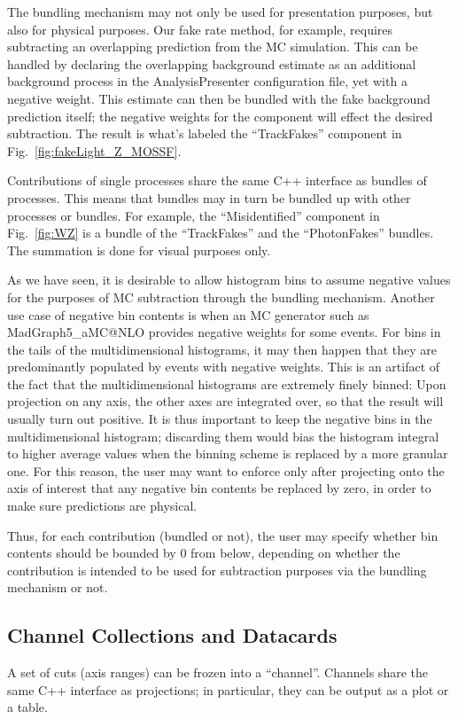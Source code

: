 The bundling mechanism may not only be used for presentation purposes, but also for physical purposes. Our fake rate method, for example, requires subtracting an overlapping prediction from the \ttbar MC simulation. This can be handled by declaring the overlapping \ttbar background estimate as an additional background process in the AnalysisPresenter configuration file, yet with a negative weight. This estimate can then be bundled with the fake background prediction itself; the negative weights for the \ttbar component will effect the desired subtraction. The result is what's labeled the ``TrackFakes'' component in Fig.~\ref{fig:fakeLight_Z_MOSSF}.

Contributions of single processes share the same C++ interface as bundles of processes. This means that bundles may in turn be bundled up with other processes or bundles. For example, the ``Misidentified'' component in Fig.~\ref{fig:WZ} is a bundle of the ``TrackFakes'' and the ``PhotonFakes'' bundles. The summation is done for visual purposes only.

As we have seen, it is desirable to allow histogram bins to assume negative values for the purposes of MC subtraction through the bundling mechanism. Another use case of negative bin contents is when an MC generator such as MadGraph5\_aMC@NLO \cite{Alwall:2011uj} provides negative weights for some events. For bins in the tails of the multidimensional histograms, it may then happen that they are predominantly populated by events with negative weights. This is an artifact of the fact that the multidimensional histograms are extremely finely binned: Upon projection on any axis, the other axes are integrated over, so that the result will usually turn out positive. It is thus important to keep the negative bins in the multidimensional histogram; discarding them would bias the histogram integral to higher average values when the binning scheme is replaced by a more granular one. For this reason, the user may want to enforce only after projecting onto the axis of interest that any negative bin contents be replaced by zero, in order to make sure predictions are physical.

Thus, for each contribution (bundled or not), the user may specify whether bin contents should be bounded by 0 from below, depending on whether the contribution is intended to be used for subtraction purposes via the bundling mechanism or not.

\subsection{Channel Collections and Datacards}
A set of cuts (axis ranges) can be frozen into a ``channel''. Channels share the same C++ interface as projections; in particular, they can be output as a plot or a table.

